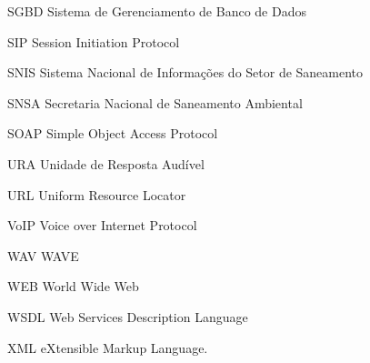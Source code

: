 \begin{siglas}
	\item[SGBD] Sistema de Gerenciamento de Banco de Dados
	\item[SIP] Session Initiation Protocol
	\item[SNIS] Sistema Nacional de Informações do Setor de Saneamento
	\item[SNSA] Secretaria Nacional de Saneamento Ambiental
	\item[SOAP] Simple Object Access Protocol
	\item[URA] Unidade de Resposta Audível
	\item[URL] Uniform Resource Locator
	\item[VoIP] Voice over Internet Protocol
	\item[WAV] WAVE
	\item[WEB] World Wide Web
	\item[WSDL] Web Services Description Language
	\item[XML] eXtensible Markup Language.
\end{siglas}
